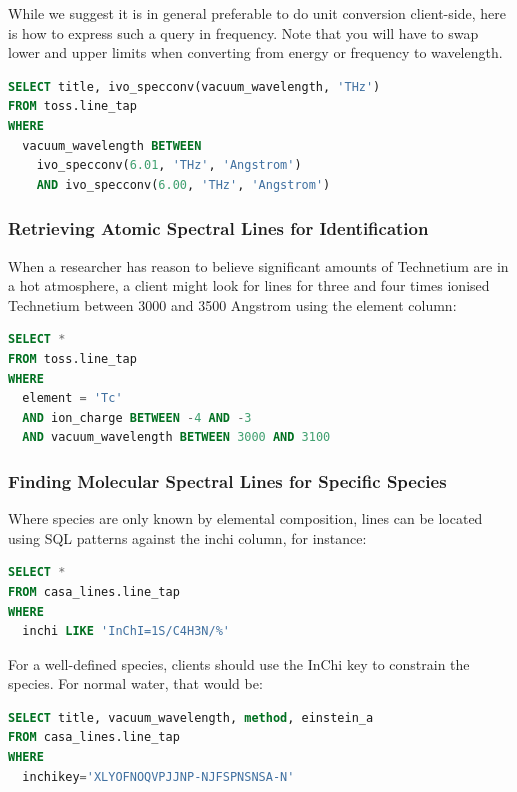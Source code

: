 \documentclass[11pt,a4paper]{ivoa}
\begin{document}
While we suggest it is in general preferable to do unit conversion
client-side, here is how to express such a query in
frequency.
Note that you will have to swap lower and upper limits when converting
from energy or frequency to wavelength.

\begin{lstlisting}[language=SQL]
SELECT title, ivo_specconv(vacuum_wavelength, 'THz')
FROM toss.line_tap
WHERE
  vacuum_wavelength BETWEEN
    ivo_specconv(6.01, 'THz', 'Angstrom')
    AND ivo_specconv(6.00, 'THz', 'Angstrom')
\end{lstlisting}


\subsubsection{Retrieving Atomic Spectral Lines for Identification}

When a researcher has reason to believe significant amounts of
Technetium are in a hot atmosphere, a client might look for lines for
three and four times ionised Technetium between 3000 and
3500 Angstrom using the element column:

\begin{lstlisting}[language=SQL]
SELECT *
FROM toss.line_tap
WHERE
  element = 'Tc'
  AND ion_charge BETWEEN -4 AND -3
  AND vacuum_wavelength BETWEEN 3000 AND 3100
\end{lstlisting}


\subsubsection{Finding Molecular Spectral Lines for Specific Species}

Where species are only known by elemental composition, lines can be
located using SQL patterns against the inchi column, for instance:

\begin{lstlisting}[language=SQL]
SELECT *
FROM casa_lines.line_tap
WHERE
  inchi LIKE 'InChI=1S/C4H3N/%'
\end{lstlisting}

For a well-defined species, clients should use the InChi key to
constrain the species.  For
normal water, that would be:

\begin{lstlisting}[language=SQL]
SELECT title, vacuum_wavelength, method, einstein_a
FROM casa_lines.line_tap
WHERE
  inchikey='XLYOFNOQVPJJNP-NJFSPNSNSA-N'
\end{lstlisting}
\end{document}
